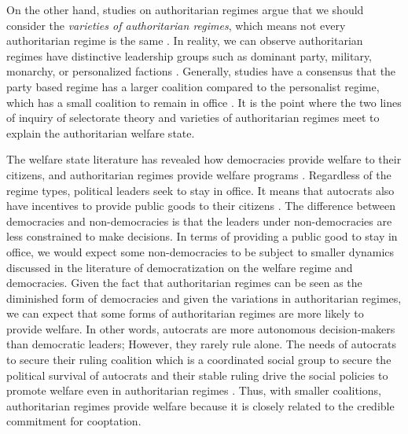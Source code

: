 \documentclass[11pt, notitlepage]{article}
\begin{document}
On the other hand, studies on authoritarian regimes argue that we should consider the \textit{varieties of authoritarian regimes}, which means not every authoritarian regime is the same \citep{Geddes1999, Geddes2014, Cheibub2010, Wahman2013, Roller2013, Soest2015}. In reality, we can observe authoritarian regimes have distinctive leadership groups such as dominant party, military, monarchy, or personalized factions \citep{Geddes2014}. Generally, studies have a consensus that the party based regime has a larger coalition compared to the personalist regime, which has a small coalition to remain in office \citep{Levitsky2002, Levitsky2010a, Gandhi2009}. It is the point where the two lines of inquiry of selectorate theory and varieties of authoritarian regimes meet to explain the authoritarian welfare state.\par

The welfare state literature has revealed how democracies provide welfare to their citizens, and authoritarian regimes provide welfare programs \citep{Tang2000, Kwon2005a, Orenstein2008, Bader2015, Ong2015, Morgenbesser2017}. Regardless of the regime types, political leaders seek to stay in office. It means that autocrats also have incentives to provide public goods to their citizens \citep{Wintrobe1998}. The difference between democracies and non-democracies is that the leaders under non-democracies are less constrained to make decisions. In terms of providing a public good to stay in office, we would expect some non-democracies to be subject to smaller dynamics discussed in the literature of democratization on the welfare regime and democracies. Given the fact that authoritarian regimes can be seen as the diminished form of democracies and given the variations in authoritarian regimes, we can expect that some forms of authoritarian regimes are more likely to provide welfare. In other words, autocrats are more autonomous decision-makers than democratic leaders; However, they rarely rule alone. The needs of autocrats to secure their ruling coalition which is a coordinated social group to secure the political survival of autocrats and their stable ruling drive the social policies to promote welfare even in authoritarian regimes \citep{Svolik2012}. Thus, with smaller coalitions, authoritarian regimes provide welfare because it is closely related to the credible commitment for cooptation.
\end{document}
